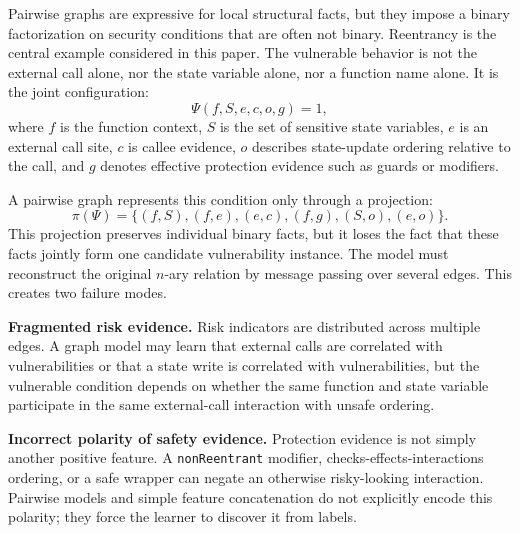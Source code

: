 \documentclass[conference]{IEEEtran}
\begin{document}
Pairwise graphs are expressive for local structural facts, but they impose a binary factorization on security conditions that are often not binary. Reentrancy is the central example considered in this paper. The vulnerable behavior is not the external call alone, nor the state variable alone, nor a function name alone. It is the joint configuration:
\begin{equation}
\Psi(f,S,e,c,o,g)=1,
\end{equation}
where $f$ is the function context, $S$ is the set of sensitive state variables, $e$ is an external call site, $c$ is callee evidence, $o$ describes state-update ordering relative to the call, and $g$ denotes effective protection evidence such as guards or modifiers.

A pairwise graph represents this condition only through a projection:
\begin{equation}
\pi(\Psi)=\{(f,S),(f,e),(e,c),(f,g),(S,o),(e,o)\}.
\end{equation}
This projection preserves individual binary facts, but it loses the fact that these facts jointly form one candidate vulnerability instance. The model must reconstruct the original $n$-ary relation by message passing over several edges. This creates two failure modes.

\textbf{Fragmented risk evidence.} Risk indicators are distributed across multiple edges. A graph model may learn that external calls are correlated with vulnerabilities or that a state write is correlated with vulnerabilities, but the vulnerable condition depends on whether the same function and state variable participate in the same external-call interaction with unsafe ordering.

\textbf{Incorrect polarity of safety evidence.} Protection evidence is not simply another positive feature. A \texttt{nonReentrant} modifier, checks-effects-interactions ordering, or a safe wrapper can negate an otherwise risky-looking interaction. Pairwise models and simple feature concatenation do not explicitly encode this polarity; they force the learner to discover it from labels.
\end{document}
